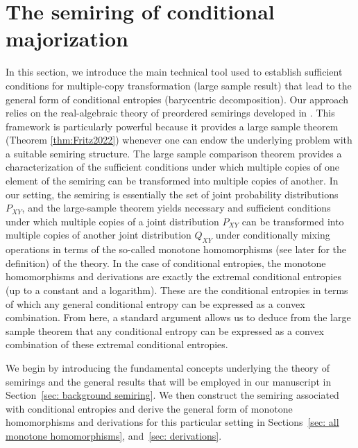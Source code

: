 \documentclass[aps,pra,11pt,onecolumn,nofootinbib,tightenlines]{revtex4-2}
\theoremstyle{definition}
\begin{document}
\section{The semiring of conditional majorization}
\label{sec: semiring of conditional entropies}
In this section, we introduce the main technical tool used to establish sufficient conditions for multiple-copy transformation (large sample result) that lead to the general form of conditional entropies (barycentric decomposition). Our approach relies on the real-algebraic theory of preordered semirings developed in \cite{fritz2023abstract,fritz2023abstractII}. This framework is particularly powerful because it provides a large sample theorem (Theorem \ref{thm:Fritz2022}) whenever one can endow the underlying problem with a suitable semiring structure.
The large sample comparison theorem provides a characterization of the sufficient conditions under which multiple copies of one element of the semiring can be transformed into multiple copies of another.
In our setting, the semiring is essentially the set of joint probability distributions $P_{XY}$, and the large-sample theorem yields necessary and sufficient conditions under which multiple copies of a joint distribution $P_{XY}$ can be transformed into multiple copies of another joint distribution $Q_{XY}$ under conditionally mixing operations in terms of the so-called monotone homomorphisms (see later for the definition) of the theory. In the case of conditional entropies, the monotone homomorphisms and derivations are exactly the extremal conditional entropies (up to a constant and a logarithm). These are the conditional entropies in terms of which any general conditional entropy can be expressed as a convex combination. From here, a standard argument \cite{mu21_renyi,haapasalo_inprep} allows us to deduce from the large sample theorem that any conditional entropy can be expressed as a convex combination of these extremal conditional entropies.

We begin by introducing the fundamental concepts underlying the theory of semirings and the general results that will be employed in our manuscript in Section~\ref{sec: background semiring}. We then construct the semiring associated with conditional entropies and derive the general form of monotone homomorphisms and derivations for this particular setting in Sections~\ref{sec: all monotone homomorphisms}, and~\ref{sec: derivations}.
\end{document}
